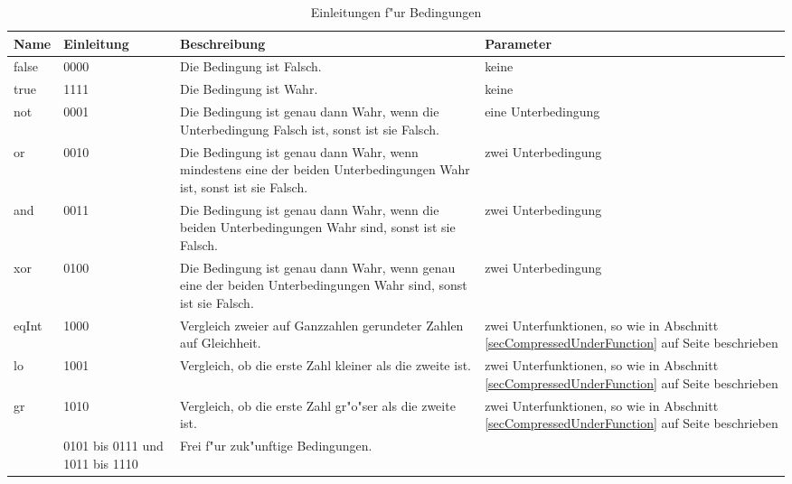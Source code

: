 \begin{table}[htbp]
\begin{center}
\begin{tabular}{|p{15mm}|p{15mm}|p{55mm}|p{40mm}|}\hline
	Name & Einleitung & Beschreibung & Parameter \\\hline\hline
	false & 0000 & Die Bedingung ist Falsch. & keine \\\hline
	true & 1111 & Die Bedingung ist Wahr. & keine \\\hline
	not & 0001 & Die Bedingung ist genau dann Wahr, wenn die Unterbedingung Falsch ist, sonst ist sie Falsch. & eine Unterbedingung \\\hline
	or & 0010 & Die Bedingung ist genau dann Wahr, wenn mindestens eine der beiden Unterbedingungen Wahr ist, sonst ist sie Falsch. & zwei Unterbedingung \\\hline
	and & 0011 & Die Bedingung ist genau dann Wahr, wenn die beiden Unterbedingungen Wahr sind, sonst ist sie Falsch. & zwei Unterbedingung \\\hline
	xor & 0100 & Die Bedingung ist genau dann Wahr, wenn genau eine der beiden Unterbedingungen Wahr sind, sonst ist sie Falsch. & zwei Unterbedingung \\\hline

	eqInt & 1000 & Vergleich zweier auf Ganzzahlen gerundeter Zahlen auf Gleichheit. & zwei Unterfunktionen, so wie in Abschnitt \ref{secCompressedUnderFunction} auf Seite \pageref{secCompressedUnderFunction} beschrieben\\\hline
	lo & 1001 & Vergleich, ob die erste Zahl kleiner als die zweite ist. & zwei Unterfunktionen, so wie in Abschnitt \ref{secCompressedUnderFunction} auf Seite \pageref{secCompressedUnderFunction} beschrieben \\\hline
	gr & 1010 & Vergleich, ob die erste Zahl gr"o"ser als die zweite ist. & zwei Unterfunktionen, so wie in Abschnitt \ref{secCompressedUnderFunction} auf Seite \pageref{secCompressedUnderFunction} beschrieben \\\hline

	 & 0101 bis 0111 und 1011 bis 1110 & Frei f"ur zuk"unftige Bedingungen. & \\\hline

\end{tabular} 
\end{center}
\caption{Einleitungen f"ur Bedingungen}
\label{tableConditionsCoding}
\end{table}

